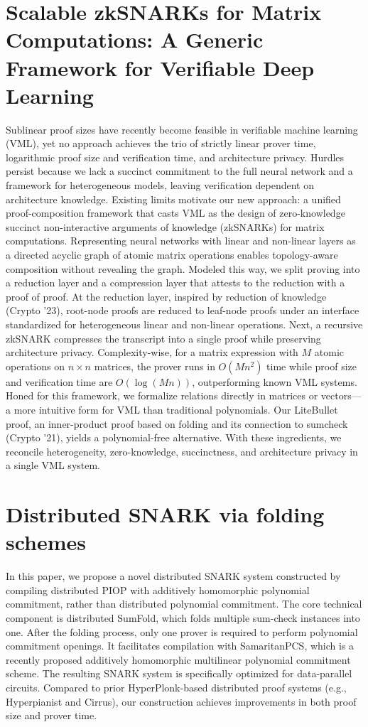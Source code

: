 \documentclass[11pt,oneside]{book}
\theoremstyle{definition}
\theoremstyle{remark}
\theoremstyle{plain}
\begin{document}
\section{\cite{cryptoeprint:2025/1646} Scalable zkSNARKs for Matrix Computations: A Generic Framework for Verifiable Deep Learning}
Sublinear proof sizes have recently become feasible in verifiable machine learning (VML), yet no approach achieves the trio of strictly linear prover time, logarithmic proof size and verification time, and architecture privacy. Hurdles persist because we lack a succinct commitment to the full neural network and a framework for heterogeneous models, leaving verification dependent on architecture knowledge. Existing limits motivate our new approach: a unified proof-composition framework that casts VML as the design of zero-knowledge succinct non-interactive arguments of knowledge (zkSNARKs) for matrix computations. Representing neural networks with linear and non-linear layers as a directed acyclic graph of atomic matrix operations enables topology-aware composition without revealing the graph. Modeled this way, we split proving into a reduction layer and a compression layer that attests to the reduction with a proof of proof. At the reduction layer, inspired by reduction of knowledge (Crypto '23), root-node proofs are reduced to leaf-node proofs under an interface standardized for heterogeneous linear and non-linear operations. Next, a recursive zkSNARK compresses the transcript into a single proof while preserving architecture privacy. Complexity-wise, for a matrix expression with $M$ atomic operations on $n \times n$ matrices, the prover runs in $O(M n^2)$ time while proof size and verification time are $O(\log(M n))$, outperforming known VML systems. Honed for this framework, we formalize relations directly in matrices or vectors---a more intuitive form for VML than traditional polynomials. Our LiteBullet proof, an inner-product proof based on folding and its connection to sumcheck (Crypto '21), yields a polynomial-free alternative. With these ingredients, we reconcile heterogeneity, zero-knowledge, succinctness, and architecture privacy in a single VML system.

\section{\cite{cryptoeprint:2025/1653} Distributed SNARK via folding schemes}
In this paper, we propose a novel distributed SNARK system constructed by compiling distributed PIOP with additively homomorphic polynomial commitment, rather than distributed polynomial commitment. The core technical component is distributed SumFold, which folds multiple sum-check instances into one. After the folding process, only one prover is required to perform polynomial commitment openings. It facilitates compilation with SamaritanPCS, which is a recently proposed additively homomorphic multilinear polynomial commitment scheme. The resulting SNARK system is specifically optimized for data-parallel circuits. Compared to prior HyperPlonk-based distributed proof systems (e.g., Hyperpianist and Cirrus), our construction achieves improvements in both proof size and prover time.
\end{document}
